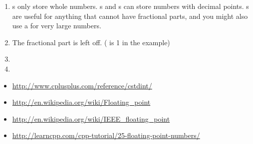 
\begin{enumerate}
	\item {}s only store whole numbers. 
				s and s can store numbers with decimal points. 
				s are useful for anything that cannot have fractional parts, and you might also use a  for very large numbers.
	\item The fractional part is left off. ( is 1 in the example)
	\item {}
	\item {}

\end{enumerate}


\begin{itemize}
\item \url{http://www.cplusplus.com/reference/cstdint/}
\item \url{http://en.wikipedia.org/wiki/Floating_point}
\item \url{http://en.wikipedia.org/wiki/IEEE_floating_point}
\item \url{http://learncpp.com/cpp-tutorial/25-floating-point-numbers/}
\end{itemize}	

